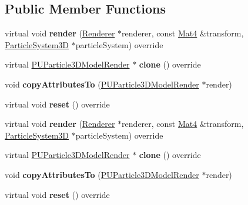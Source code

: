 \subsection*{Public Member Functions}
\begin{DoxyCompactItemize}
\item 
\mbox{\label{classPUParticle3DModelRender_afbae8647fa6a4b0e2e4619976783a9f4}} 
virtual void {\bfseries render} (\hyperlink{classRenderer}{Renderer} $\ast$renderer, const \hyperlink{classMat4}{Mat4} \&transform, \hyperlink{classParticleSystem3D}{Particle\+System3D} $\ast$particle\+System) override
\item 
\mbox{\label{classPUParticle3DModelRender_aad86b4e339580f3e3c7dddafbfacacf1}} 
virtual \hyperlink{classPUParticle3DModelRender}{P\+U\+Particle3\+D\+Model\+Render} $\ast$ {\bfseries clone} () override
\item 
\mbox{\label{classPUParticle3DModelRender_aaaf4c0d2c85ee5a88b54ad2d2f8cf503}} 
void {\bfseries copy\+Attributes\+To} (\hyperlink{classPUParticle3DModelRender}{P\+U\+Particle3\+D\+Model\+Render} $\ast$render)
\item 
\mbox{\label{classPUParticle3DModelRender_a76de6d439c0f4db7a0b7b4b5af2c15f5}} 
virtual void {\bfseries reset} () override
\item 
\mbox{\label{classPUParticle3DModelRender_ac446b13f7d036645fbafeea717e82239}} 
virtual void {\bfseries render} (\hyperlink{classRenderer}{Renderer} $\ast$renderer, const \hyperlink{classMat4}{Mat4} \&transform, \hyperlink{classParticleSystem3D}{Particle\+System3D} $\ast$particle\+System) override
\item 
\mbox{\label{classPUParticle3DModelRender_a3d27d89f674ad11bc5e3a026edb5a62a}} 
virtual \hyperlink{classPUParticle3DModelRender}{P\+U\+Particle3\+D\+Model\+Render} $\ast$ {\bfseries clone} () override
\item 
\mbox{\label{classPUParticle3DModelRender_aaaf4c0d2c85ee5a88b54ad2d2f8cf503}} 
void {\bfseries copy\+Attributes\+To} (\hyperlink{classPUParticle3DModelRender}{P\+U\+Particle3\+D\+Model\+Render} $\ast$render)
\item 
\mbox{\label{classPUParticle3DModelRender_a18b1e7811545300e24d4f59ac4ff3476}} 
virtual void {\bfseries reset} () override
\end{DoxyCompactItemize}
